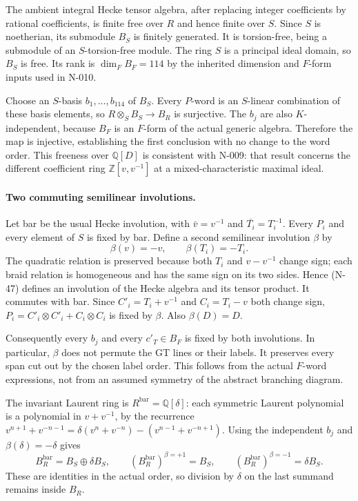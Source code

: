 The ambient integral Hecke tensor algebra, after replacing
integer coefficients by rational coefficients, is finite free
over $R$ and hence finite over $S$.  Since $S$ is noetherian,
its submodule $B_S$ is finitely generated.  It is torsion-free,
being a submodule of an $S$-torsion-free module.  The ring $S$
is a principal ideal domain, so $B_S$ is free.  Its rank is
$\dim_F B_F=114$ by the inherited dimension and $F$-form inputs
used in N-010.

Choose an $S$-basis $b_1,\ldots,b_{114}$ of $B_S$.  Every $P$-word
is an $S$-linear combination of these basis elements, so
$R\otimes_S B_S\to B_R$ is surjective.  The $b_j$ are also
$K$-independent, because $B_F$ is an $F$-form of the actual
generic algebra.  Therefore the map is injective, establishing
the first conclusion with no change to the word order.
This freeness over $\mathbb Q[D]$ is consistent with N-009:
that result concerns the different coefficient ring
$\mathbb Z[v,v^{-1}]$ at a mixed-characteristic maximal ideal.

\paragraph{Two commuting semilinear involutions.}
Let bar be the usual Hecke involution, with $\bar v=v^{-1}$
and $\overline{T_i}=T_i^{-1}$.  Every $P_i$ and every element
of $S$ is fixed by bar.  Define a second semilinear involution
$\beta$ by
\[
             \beta(v)=-v,\qquad \beta(T_i)=-T_i.
 \tag{N-47}
\]
The quadratic relation is preserved because both $T_i$ and
$v-v^{-1}$ change sign; each braid relation is homogeneous
and has the same sign on its two sides.  Hence (N-47) defines
an involution of the Hecke algebra and its tensor product.
It commutes with bar.  Since $C'_i=T_i+v^{-1}$ and
$C_i=T_i-v$ both change sign, $P_i=C'_i\otimes C'_i+C_i\otimes C_i$
is fixed by $\beta$.  Also $\beta(D)=D$.

Consequently every $b_j$ and every $c'_T\in B_F$ is fixed
by both involutions.  In particular, $\beta$ does not permute
the GT lines or their labels.  It preserves every span cut out
by the chosen label order.  This follows from the actual
$F$-word expressions, not from an assumed symmetry of the
abstract branching diagram.

The invariant Laurent ring is $R^{\mathrm{bar}}=\mathbb Q[\delta]$:
each symmetric Laurent polynomial is a polynomial in
$v+v^{-1}$, by the recurrence
$v^{n+1}+v^{-n-1}=\delta(v^n+v^{-n})-(v^{n-1}+v^{-n+1})$.
Using the independent $b_j$ and $\beta(\delta)=-\delta$ gives
\[
 B_R^{\mathrm{bar}}=B_S\oplus\delta B_S,\qquad
 (B_R^{\mathrm{bar}})^{\beta=+1}=B_S,\qquad
 (B_R^{\mathrm{bar}})^{\beta=-1}=\delta B_S.
 \tag{N-48}
\]
These are identities in the actual order, so division by
$\delta$ on the last summand remains inside $B_R$.

